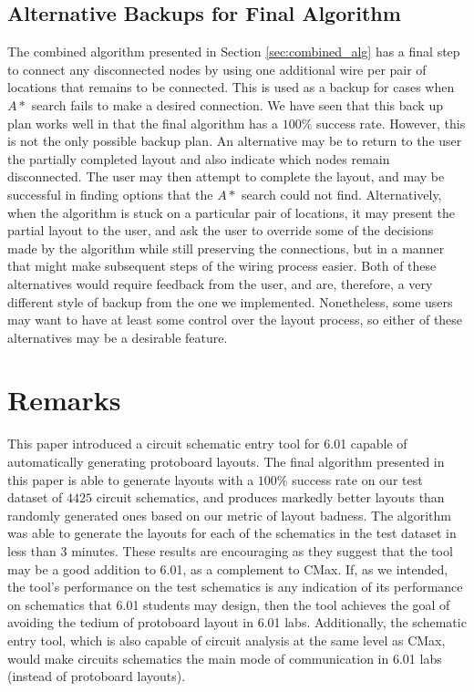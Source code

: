 \subsection{Alternative Backups for Final Algorithm}
The combined algorithm presented in Section \ref{sec:combined_alg} has a final
step to connect any disconnected nodes by using one additional wire per pair of
locations that remains to be connected. This is used as a backup for cases
when $A*$ search fails to make a desired connection. We have seen that this
back up plan works well in that the final algorithm has a $100\%$ success rate.
However, this is not the only possible backup plan. An alternative may be to
return to the user the partially completed layout and also indicate which nodes
remain disconnected. The user may then attempt to complete the layout, and may
be successful in finding options that the $A*$ search could not find.
Alternatively, when the algorithm is stuck on a particular pair of locations, it
may present the partial layout to the user, and ask the user to override some of
the decisions made by the algorithm while still preserving the connections, but
in a manner that might make subsequent steps of the wiring process easier. Both
of these alternatives would require feedback from the user, and are, therefore,
a very different style of backup from the one we implemented. Nonetheless, some
users may want to have at least some control over the layout process,
so either of these alternatives may be a desirable feature.

\section{Remarks}

This paper introduced a circuit schematic entry tool for 6.01 capable of
automatically generating protoboard layouts. The final algorithm presented in
this paper is able to generate layouts with a $100\%$ success rate on our test
dataset of $4425$ circuit schematics, and produces markedly better layouts than
randomly generated ones based
on our metric of layout badness. The algorithm was able to generate the layouts
for each of the schematics in the test dataset in less than $3$ minutes.
These results are encouraging as they suggest
that the tool may be a good addition to 6.01, as a complement to CMax. If, as
we intended, the tool's performance on the test schematics is any indication of
its performance on schematics that 6.01 students may design, then the tool
achieves the goal of avoiding the tedium of protoboard layout in 6.01 labs.
Additionally, the schematic entry tool, which is also capable of circuit
analysis at the same level as CMax, would make circuits schematics the main
mode of communication in 6.01 labs (instead of protoboard layouts).
